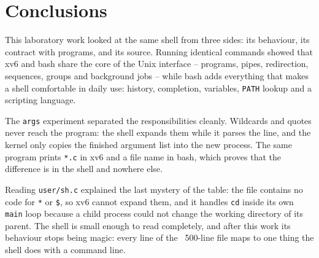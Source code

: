 \documentclass[12pt,a4paper]{article}
\begin{document}
\newpage
\section*{Conclusions}

This laboratory work looked at the same shell from three sides: its behaviour, its contract with programs, and its source. Running identical commands showed that xv6 and bash share the core of the Unix interface -- programs, pipes, redirection, sequences, groups and background jobs -- while bash adds everything that makes a shell comfortable in daily use: history, completion, variables, \texttt{PATH} lookup and a scripting language.

The \texttt{args} experiment separated the responsibilities cleanly. Wildcards and quotes never reach the program: the shell expands them while it parses the line, and the kernel only copies the finished argument list into the new process. The same program prints \texttt{*.c} in xv6 and a file name in bash, which proves that the difference is in the shell and nowhere else.

Reading \texttt{user/sh.c} explained the last mystery of the table: the file contains no code for \texttt{*} or \texttt{\$}, so xv6 cannot expand them, and it handles \texttt{cd} inside its own \texttt{main} loop because a child process could not change the working directory of its parent. The shell is small enough to read completely, and after this work its behaviour stops being magic: every line of the ~500-line file maps to one thing the shell does with a command line.
\end{document}
